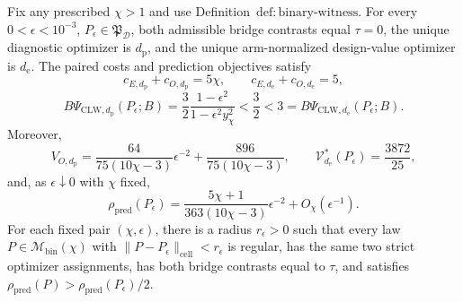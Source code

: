 Fix any prescribed \(\chi>1\) and use Definition~\(\mathrm{def{:}binary\text{-}witness}\). For every \(0<\epsilon<10^{-3}\), \(P_\epsilon\in\mathfrak P_{\mathcal D}\), both admissible bridge contrasts equal \(\tau=0\), the unique diagnostic optimizer is \(d_{\mathrm p}\), and the unique arm-normalized design-value optimizer is \(d_{\mathrm e}\). The paired costs and prediction objectives satisfy
\[
 c_{E,d_{\mathrm p}}+c_{O,d_{\mathrm p}}=5\chi,
 \qquad
 c_{E,d_{\mathrm e}}+c_{O,d_{\mathrm e}}=5,
\]
\[
 B\Psi_{\mathrm{CLW},d_{\mathrm p}}(P_\epsilon;B)
 =\frac32\frac{1-\epsilon^2}{1-\epsilon^2y_\chi^2}
 <\frac32<3
 =B\Psi_{\mathrm{CLW},d_{\mathrm e}}(P_\epsilon;B).
\]
Moreover,
\[
 V_{O,d_{\mathrm p}}
 =\frac{64}{75(10\chi-3)}\epsilon^{-2}
 +\frac{896}{75(10\chi-3)},
 \qquad
 \mathcal V_{d_{\mathrm e}}^*(P_\epsilon)=\frac{3872}{25},
\]
and, as \(\epsilon\downarrow0\) with \(\chi\) fixed,
\[
 \rho_{\mathrm{pred}}(P_\epsilon)
 =\frac{5\chi+1}{363(10\chi-3)}\epsilon^{-2}
 +O_\chi(\epsilon^{-1}).
\]
For each fixed pair \((\chi,\epsilon)\), there is a radius \(r_\epsilon>0\) such that every law \(P\in\mathcal M_{\mathrm{bin}}(\chi)\) with \(\|P-P_\epsilon\|_{\mathrm{cell}}<r_\epsilon\) is regular, has the same two strict optimizer assignments, has both bridge contrasts equal to \(\tau\), and satisfies \(\rho_{\mathrm{pred}}(P)>\rho_{\mathrm{pred}}(P_\epsilon)/2\).